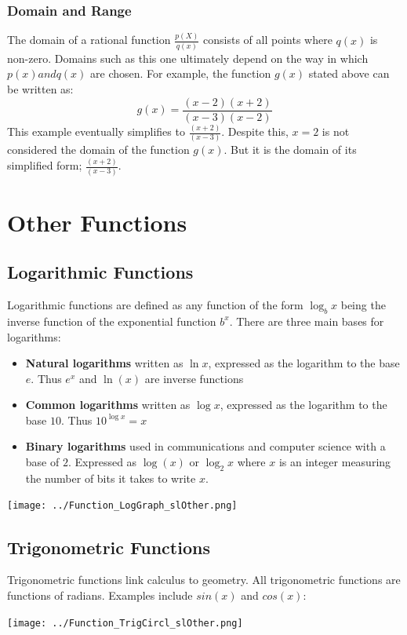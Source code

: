 \documentclass[11pt,oneside]{book}              %
\begin{document}
\subsubsection{Domain and Range}
The domain of a rational function $\frac{p(X)}{q(x)}$ consists of all points where $q(x)$ is non-zero. Domains such as this one ultimately depend on the way in which $p(x) and q(x)$ are chosen. For example, the function $g(x)$ stated above can be written as:
\begin{equation*}
	g(x) = \frac{(x-2)(x+2)}{(x-3)(x-2)}
\end{equation*}
This example eventually simplifies to $\frac{(x+2)}{(x-3)}$. Despite this, $x=2$ is not considered the domain of the function $g(x)$. But it is the domain of its simplified form; $\frac{(x+2)}{(x-3)}$.

\section{Other Functions}
\subsection{Logarithmic Functions}
Logarithmic functions are defined as any function of the form $\log_bx$ being the inverse function of the exponential function $b^x$. There are three main bases for logarithms:
\begin{itemize}
	\item \textbf{Natural logarithms} written as $\ln x$, expressed as the logarithm to the base $e$. Thus $e^x$ and $\ln(x)$ are inverse functions
	\item \textbf{Common logarithms} written as $\log x$, expressed as the logarithm to the base $10$. Thus $10^{\log x} = x$
	\item \textbf{Binary logarithms} used in communications and computer science with a base of $2$. Expressed as $\log(x)$ or $\log_2x$ where $x$ is an integer measuring the number of bits it takes to write $x$.
\end{itemize}
\begin{center}\texttt{[image: ../Function\_LogGraph\_slOther.png]} \end{center}

\subsection{Trigonometric Functions}
Trigonometric functions link calculus to geometry. All trigonometric functions are functions of radians. Examples include $sin(x)$ and $cos(x)$:
\begin{center}\texttt{[image: ../Function\_TrigCircl\_slOther.png]} \end{center}
\end{document}
